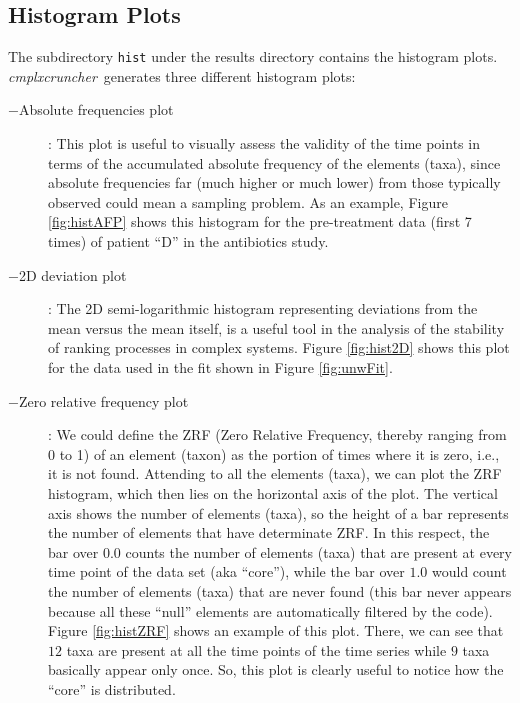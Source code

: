\documentclass[12pt,oneside,letterpaper]{article}
\newcommand{\CC}[0]{\emph{cmplxcruncher}}
\begin{document}
\subsection{Histogram Plots} 
The subdirectory \texttt{hist} under the results directory contains the histogram plots. \CC\ generates three different histogram plots:
\begin{description}
	\item[$-$Absolute frequencies plot]: This plot is useful to visually assess the validity of the time points in terms of the accumulated absolute frequency of the elements (taxa), since absolute frequencies far (much higher or much lower) from those typically observed could mean a sampling problem. As an example, Figure \ref{fig:histAFP} shows this histogram for the pre-treatment data (first 7 times) of patient ``D'' in the antibiotics study\cite{antibiotic}. 
	\item[$-$2D deviation plot]: The 2D semi-logarithmic histogram representing deviations from the mean versus the mean itself, is a useful tool in the analysis of the stability of ranking processes in complex systems\cite{ranking}. Figure \ref{fig:hist2D} shows this plot for the data used in the fit shown in Figure \ref{fig:unwFit}.
	\item[$-$Zero relative frequency plot]: We could define the ZRF (Zero Relative Frequency, thereby ranging from 0 to 1) of an element (taxon) as the portion of times where it is zero, i.e., it is not found. Attending to all the elements (taxa), we can plot the ZRF histogram, which then lies on the horizontal axis of the plot. The vertical axis shows the number of elements (taxa), so the height of a bar represents the number of elements that have determinate ZRF. In this respect, the bar over $0.0$ counts the number of elements (taxa) that are present at every time point of the data set (aka ``core''), while the bar over $1.0$ would count the number of elements (taxa) that are never found (this bar never appears because all these ``null'' elements are automatically filtered by the code). Figure \ref{fig:histZRF} shows an example of this plot. There, we can see that $12$ taxa are present at all the time points of the time series while $9$ taxa basically appear only once. So, this plot is clearly useful to notice how the ``core'' is distributed.
\end{description}
\end{document}
